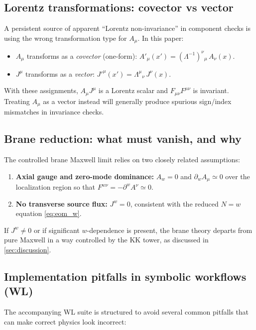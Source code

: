 \documentclass[11pt]{article}
\newcommand{\A}{A}
\newcommand{\F}{F}
\newcommand{\J}{J}
\begin{document}
\subsection{Lorentz transformations: covector vs vector}

A persistent source of apparent ``Lorentz non-invariance'' in component checks is
using the wrong transformation type for \(\A_\mu\). In this paper:

\begin{itemize}
\item \(\A_\mu\) transforms as a \emph{covector} (one-form):
\(\A'_\mu(x')=(\Lambda^{-1})^\nu{}_\mu\,\A_\nu(x)\).
\item \(\J^\mu\) transforms as a \emph{vector}:
\(\J'^\mu(x')=\Lambda^\mu{}_\nu\,\J^\nu(x)\).
\end{itemize}

With these assignments, \(\A_\mu\J^\mu\) is a Lorentz scalar and
\(\F_{\mu\nu}\F^{\mu\nu}\) is invariant. Treating \(\A_\mu\) as a vector instead
will generally produce spurious sign/index mismatches in invariance checks.

\subsection{Brane reduction: what must vanish, and why}

The controlled brane Maxwell limit relies on two closely related assumptions:

\begin{enumerate}
\item \textbf{Axial gauge and zero-mode dominance:} \(\A_w=0\) and
\(\partial_w\A_\mu\simeq 0\) over the localization region so that
\(\F^{w\nu}=-\partial^w\A^\nu\simeq 0\).
\item \textbf{No transverse source flux:} \(\J^w=0\), consistent with the reduced
\(N=w\) equation \cref{eq:eom_w}.
\end{enumerate}

If \(\J^w\neq 0\) or if significant \(w\)-dependence is present, the brane theory
departs from pure Maxwell in a way controlled by the KK tower, as discussed in
\cref{sec:discussion}.

\subsection{Implementation pitfalls in symbolic workflows (WL)}

The accompanying WL suite is structured to avoid several common pitfalls that can
make correct physics look incorrect:
\end{document}
